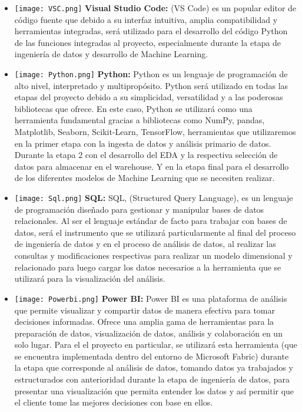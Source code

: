 \documentclass[12pt]{article}
\begin{document}
\begin{itemize}
    \item \texttt{[image: VSC.png]}
    \textbf{Visual Studio Code:} (VS Code) es un popular editor de código fuente que debido a su interfaz intuitiva, amplia compatibilidad y herramientas integradas, será utilizado para el desarrollo del código Python de las funciones integradas al proyecto, especialmente durante la etapa de ingeniería de datos y desarrollo de Machine Learning.
    
    \item \texttt{[image: Python.png]}
    \textbf{Python:} Python es un lenguaje de programación de alto nivel, interpretado y multipropósito. 
    Python será utilizado en todas las etapas del proyecto debido a su simplicidad, versatilidad y a las poderosas bibliotecas que ofrece. En este caso, Python se utilizará como una herramienta fundamental gracias a bibliotecas como NumPy, pandas, Matplotlib, Seaborn, Scikit-Learn, TensorFlow, herramientas que utilizaremos en la primer etapa con la ingesta de datos y análisis primario de datos. Durante la etapa 2 con el desarrollo del EDA y la respectiva selección de datos para almacenar en el warehouse. Y en la etapa final para el desarrollo de los diferentes modelos de Machine Learning que se necesiten realizar. 

    \item \texttt{[image: Sql.png]}
    \textbf{SQL:} SQL, (Structured Query Language), es un lenguaje de programación diseñado para gestionar y manipular bases de datos relacionales. Al ser el lenguaje estándar de facto para trabajar con bases de datos, será el instrumento que se utilizará particularmente al final del  proceso de ingeniería de datos y en el proceso de análisis de datos, al realizar las consultas y modificaciones respectivas para realizar un modelo dimensional y relacionado para luego cargar los datos necesarios a la herramienta que se utilizará para la visualización del análisis. 

    \item \texttt{[image: Powerbi.png]}
    \textbf{Power BI:} Power BI es una plataforma de análisis que permite  visualizar y compartir datos de manera efectiva para tomar decisiones informadas. Ofrece una amplia gama de herramientas para la preparación de datos, visualización de datos, análisis y colaboración en un solo lugar. Para el el proyecto en particular, se utilizará esta herramienta (que se encuentra implementada dentro del entorno de Microsoft Fabric) durante la etapa que corresponde al análisis de datos, tomando datos ya trabajados y estructurados con anterioridad durante la etapa de ingeniería de datos, para presentar una visualización que permita entender los datos y así permitir que el cliente tome las mejores decisiones con base en ellos. 


\end{itemize}
\end{document}
